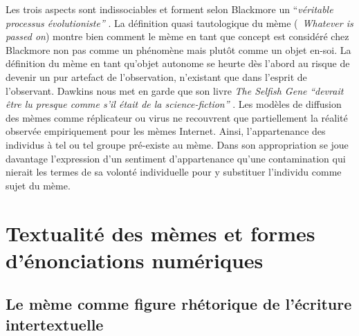 Les trois aspects sont indissociables et forment selon Blackmore un {\textquotedblleft}\textit{véritable processus évolutioniste{\textquotedblright} }\citep{Blackmore2006}. La définition quasi tautologique du mème ({\guillemotleft}~\textit{Whatever is passed on{\guillemotright}}) montre bien comment le mème en tant que concept est considéré chez Blackmore non pas comme un phénomène mais plutôt comme un objet en-soi. La définition du mème en tant qu{\textquoteright}objet autonome se heurte dès l{\textquoteright}abord au risque de devenir un pur artefact de l{\textquoteright}observation, n{\textquoteright}existant que dans l{\textquoteright}esprit de l{\textquoteright}observant. Dawkins nous met en garde que son livre \textit{The Selfish Gene} \textit{{\textquotedblleft}devrait être lu presque comme s{\textquoteright}il était de la science-fiction{\textquotedblright} }\citep{Dawkins1989}. Les modèles de diffusion des mèmes comme réplicateur ou virus ne recouvrent que partiellement la réalité observée empiriquement pour les mèmes Internet. Ainsi, l{\textquoteright}appartenance des individus à tel ou tel groupe pré-existe au mème. Dans son appropriation se joue davantage l{\textquoteright}expression d{\textquoteright}un sentiment d{\textquoteright}appartenance qu{\textquoteright}une contamination qui nierait les termes de sa volonté individuelle pour y substituer l{\textquoteright}individu comme sujet du mème.  


\section[Textualité des mèmes et formes d{\textquoteright}énonciations numériques]{Textualité des mèmes et formes d{\textquoteright}énonciations numériques}

\subsection[Le mème comme figure rhétorique de l{\textquoteright}écriture intertextuelle]{Le mème comme figure rhétorique de l{\textquoteright}écriture intertextuelle}

